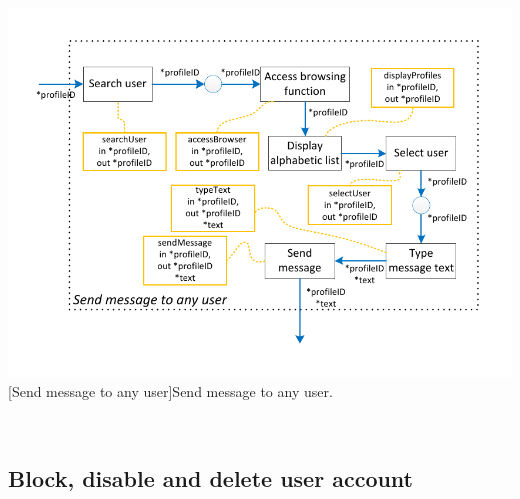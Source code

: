 \documentclass[11pt, a4paper,svglistings,oneside]{book}
\begin{document}
$\;$ \\
\noindent\begin{minipage}{\textwidth}
    \centering
   \includegraphics[scale=1]{nav_SendMessageAnyUser.pdf}
 [Send message to any user]{Send message to any user.}
\end{minipage}
$\;$ \\ 

\subsection{Block, disable and delete user account}
\end{document}
